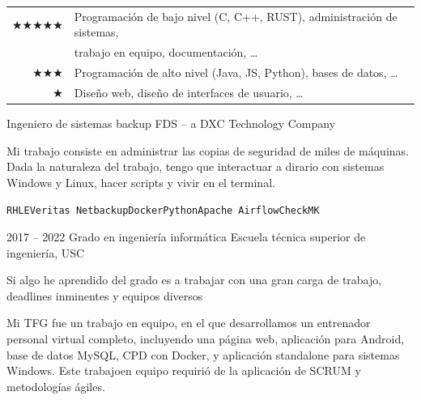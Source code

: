 \documentclass[9pt]{developercv} %
\begin{document}
\begin{minipage}[t]{1.0\textwidth}
  \begin{center}
    {\Large
      \begin{tabular}{rl}
        $\bigstar\bigstar\bigstar\bigstar\bigstar$ & \hspace{0.25cm} Programación de bajo nivel (C, C++, RUST), administración de sistemas,    \\
                                               & \hspace{0.25cm} trabajo en equipo, documentación, \ldots    \vspace{0.25cm} \\
        $\bigstar\bigstar\bigstar$                 & \hspace{0.25cm} Programación de alto nivel (Java, JS, Python), bases de datos, \ldots    \vspace{0.25cm} \\
        $\bigstar$                                 & \hspace{0.25cm} Diseño web, diseño de interfaces de usuario, \ldots   \vspace{0.25cm} \\
      \end{tabular}
    }
  \end{center}
\end{minipage}



\begin{entrylist}
   {Ingeniero de sistemas backup} {FDS -- a DXC Technology Company} {Mi trabajo consiste en administrar las copias de seguridad de miles de máquinas. Dada la naturaleza del trabajo, tengo que interactuar a dirario con sistemas Windows y Linux, hacer scripts y vivir en el terminal.

          \texttt{RHLE}\slashsep\texttt{Veritas Netbackup}\slashsep\texttt{Docker}\slashsep\texttt{Python}\slashsep\texttt{Apache Airflow}\slashsep\texttt{CheckMK}}
  \entry
      {2017 -- 2022}
      {Grado en ingeniería informática}
      {Escuela técnica superior de ingeniería, USC}
      {
        Si algo he aprendido del grado es a trabajar con una gran carga de trabajo, deadlines inminentes y equipos diversos

        Mi TFG fue un trabajo en equipo, en el que desarrollamos un entrenador personal virtual completo, incluyendo una página web, aplicación para Android, base de datos MySQL, CPD con Docker, y aplicación standalone para sistemas Windows. Este trabajoen equipo requirió de la aplicación de SCRUM y metodologías ágiles.
      }
\end{entrylist}
\end{document}
